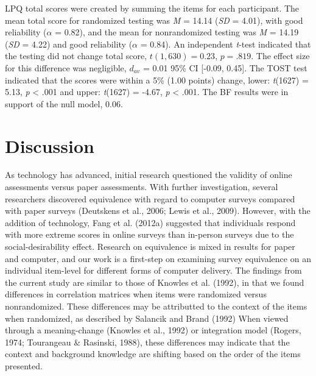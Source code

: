 \documentclass[english,man, mask]{apa6}
\theoremstyle{definition}
\theoremstyle{definition}
\theoremstyle{definition}
\theoremstyle{remark}
\begin{document}
LPQ total scores were created by summing the items for each participant.
The mean total score for randomized testing was \emph{M} = 14.14
(\emph{SD} = 4.01), with good reliability (\(\alpha\) = 0.82), and the
mean for nonrandomized testing was \emph{M} = 14.19 (\emph{SD} = 4.22)
and good reliability (\(\alpha\) = 0.84). An independent \emph{t}-test
indicated that the testing did not change total score,
\(t(1,630) = 0.23\), \(p = .819\). The effect size for this difference
was negligible, \(d_{av}\) = 0.01 95\% CI {[}-0.09, 0.45{]}. The TOST
test indicated that the scores were within a 5\% (1.00 points) change,
lower: \emph{t}(1627) = 5.13, \emph{p} \textless{} .001 and upper:
\emph{t}(1627) = -4.67, \emph{p} \textless{} .001. The BF results were
in support of the null model, 0.06.

\section{Discussion}\label{discussion}

As technology has advanced, initial research questioned the validity of
online assessments versus paper assessments. With further investigation,
several researchers discovered equivalence with regard to computer
surveys compared with paper surveys (Deutskens et al., 2006; Lewis et
al., 2009). However, with the addition of technology, Fang et al.
(2012a) suggested that individuals respond with more extreme scores in
online surveys than in-person surveys due to the social-desirability
effect. Research on equivalence is mixed in results for paper and
computer, and our work is a first-step on examining survey equivalence
on an individual item-level for different forms of computer delivery.
The findings from the current study are similar to those of Knowles et
al. (1992), in that we found differences in correlation matrices when
items were randomized versus nonrandomized. These differences may be
attributted to the context of the items when randomized, as described by
Salancik and Brand (1992) When viewed through a meaning-change (Knowles
et al., 1992) or integration model (Rogers, 1974; Tourangeau \&
Rasinski, 1988), these differences may indicate that the context and
background knowledge are shifting based on the order of the items
presented.
\end{document}
